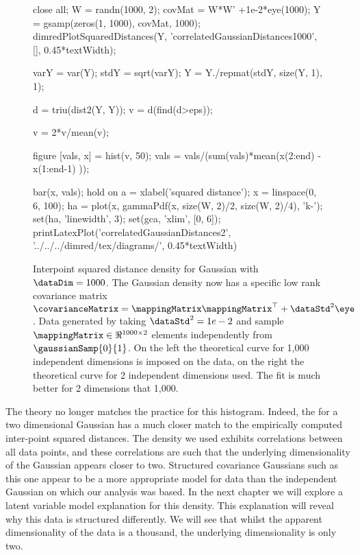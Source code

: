 \begin{figure}
  \begin{matlab}
    close all;
    W = randn(1000, 2);
    covMat = W*W' +1e-2*eye(1000);
    Y = gsamp(zeros(1, 1000), covMat, 1000);
    dimredPlotSquaredDistances(Y, 'correlatedGaussianDistances1000', [], 0.45*textWidth);

    varY = var(Y);
    stdY = sqrt(varY);
    Y = Y./repmat(stdY, size(Y, 1), 1);

    d = triu(dist2(Y, Y));
    v = d(find(d>eps));

    v = 2*v/mean(v);

    figure
    [vals, x] = hist(v, 50);
    vals = vals/(sum(vals)*mean(x(2:end) - x(1:end-1) ));

    bar(x, vals);
    hold on
    a = xlabel('squared distance');
    x = linspace(0, 6, 100);
    ha = plot(x, gammaPdf(x, size(W, 2)/2, size(W, 2)/4), 'k-');
    set(ha, 'linewidth', 3);
    set(gca, 'xlim', [0, 6]);
    printLatexPlot('correlatedGaussianDistances2', '../../../dimred/tex/diagrams/', 0.45*textWidth)
  \end{matlab}

  \begin{center}
    \hfill
    \vspace{1cm}
  \end{center}
  \caption{Interpoint squared distance density for Gaussian with
    $\dataDim=1000$. The Gaussian density now has a specific low rank
    covariance matrix
    $\covarianceMatrix=\mappingMatrix\mappingMatrix^{\top}+\dataStd^{2}\eye$.
    Data generated by taking $\dataStd^{2}=1e-2$ and sample
    $\mappingMatrix\in\Re^{1000\times2}$ elements independently from
    $\gaussianSamp{0}{1}$. On the left the theoretical curve for 1,000
    independent dimensions is imposed on the data, on the right the
    theoretical curve for 2 independent dimensions used. The fit is
    much better for 2 dimensions that 1,000.}\label{fig:ppcaGaussian}

\end{figure}

The theory no longer matches the practice for this histogram. Indeed,
the for a two dimensional Gaussian has a much closer match to the
empirically computed inter-point squared distances. The density we
used exhibits correlations between all data points, and these
correlations are such that the underlying dimensionality of the
Gaussian appears closer to two. Structured covariance Gaussians such
as this one appear to be a more appropriate model for data than the
independent Gaussian on which our analysis was based. In the next
chapter we will explore a latent variable model explanation for this density. This explanation will reveal
why this data is structured differently. We will see that whilst the
apparent dimensionality of the data is a thousand, the underlying
dimensionality is only two.


